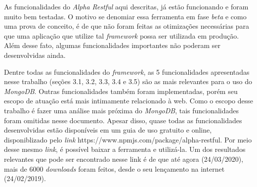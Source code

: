 As funcionalidades do \textit{Alpha Restful} aqui descritas, já estão funcionando e foram muito bem testadas. O motivo se denomiar essa ferramenta em fase \textit{beta} e como uma prova de conceito, é de que não foram feitas as otimizações necessárias para que uma aplicação que utilize tal \textit{framework} possa ser utilizada em produção. Além desse fato, algumas funcionalidades importantes não poderam ser desenvolvidas ainda.


Dentre todas as funcionalidades do \textit{framework}, as 5 funcionalidades apresentadas nesse trabalho (seções 3.1, 3.2, 3.3, 3.4 e 3.5) são as mais relevantes para o uso do \textit{MongoDB}. Outras funcionalidades também foram implementadas, porém seu escopo de atuação está mais intimamente relacionado à web. Como o escopo desse trabalho é fazer uma análise mais próxima do \textit{MongoDB}, tais funcionalidades foram omitidas nesse documento. Apesar disso, quase todas as funcionalidades desenvolvidas estão disponíveis em um guia de uso gratuito e online, disponiblizado pelo \textit{link} https://www.npmjs.com/package/alpha-restful. Por meio desse mesmo \textit{link}, é possível baixar a ferramenta e utilizá-la. Um dos resultados relevantes que pode ser encontrado nesse link é de que até agora (24/03/2020), mais de 6000 \textit{downloads} foram feitos, desde o seu lençamento na internet (24/02/2019).